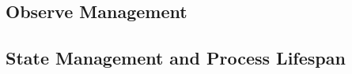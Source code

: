 \subsection{Observe Management}\label{observe_management}

\subsection{State Management and Process Lifespan}\label{state_management}











